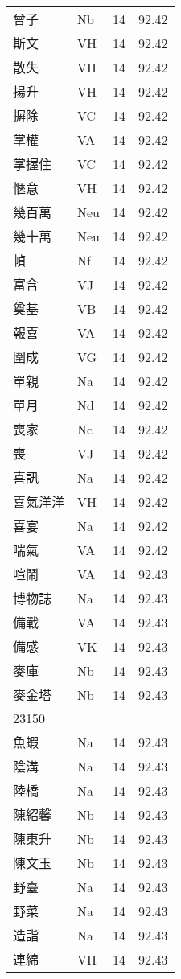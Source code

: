 \documentclass[twocolumn]{book}
\begin{document}
\begin{supertabular}{llrr}
曾子 & Nb & 14 &  92.42\\
斯文 & VH & 14 &  92.42\\
散失 & VH & 14 &  92.42\\
揚升 & VH & 14 &  92.42\\
摒除 & VC & 14 &  92.42\\
掌權 & VA & 14 &  92.42\\
掌握住 & VC & 14 &  92.42\\
愜意 & VH & 14 &  92.42\\
幾百萬 & Neu & 14 &  92.42\\
幾十萬 & Neu & 14 &  92.42\\
幀 & Nf & 14 &  92.42\\
富含 & VJ & 14 &  92.42\\
奠基 & VB & 14 &  92.42\\
報喜 & VA & 14 &  92.42\\
圍成 & VG & 14 &  92.42\\
單親 & Na & 14 &  92.42\\
單月 & Nd & 14 &  92.42\\
喪家 & Nc & 14 &  92.42\\
喪 & VJ & 14 &  92.42\\
喜訊 & Na & 14 &  92.42\\
喜氣洋洋 & VH & 14 &  92.42\\
喜宴 & Na & 14 &  92.42\\
喘氣 & VA & 14 &  92.42\\
喧鬧 & VA & 14 &  92.43\\
博物誌 & Na & 14 &  92.43\\
備戰 & VA & 14 &  92.43\\
備感 & VK & 14 &  92.43\\
麥庫 & Nb & 14 &  92.43\\
麥金塔 & Nb & 14 &  92.43\\
23150\\
魚蝦 & Na & 14 &  92.43\\
陰溝 & Na & 14 &  92.43\\
陸橋 & Na & 14 &  92.43\\
陳紹馨 & Nb & 14 &  92.43\\
陳東升 & Nb & 14 &  92.43\\
陳文玉 & Nb & 14 &  92.43\\
野臺 & Na & 14 &  92.43\\
野菜 & Na & 14 &  92.43\\
造詣 & Na & 14 &  92.43\\
連綿 & VH & 14 &  92.43\\

\end{supertabular}
\end{document}
